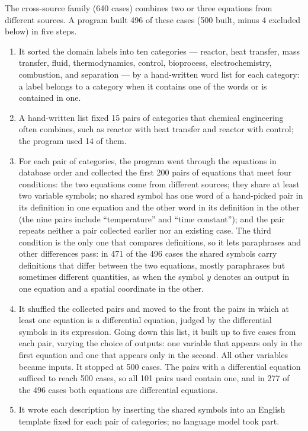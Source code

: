 The cross-source family (640 cases) combines two or three equations from different sources. A
program built 496 of these cases (500 built, minus 4 excluded below) in five steps.
\begin{enumerate}
  \item It sorted the domain labels into ten categories --- reactor, heat transfer, mass transfer,
    fluid, thermodynamics, control, bioprocess, electrochemistry, combustion, and separation --- by
    a hand-written word list for each category: a label belongs to a category when it contains one
    of the words or is contained in one.
  \item A hand-written list fixed 15 pairs of categories that chemical engineering often combines,
    such as reactor with heat transfer and reactor with control; the program used 14 of them.
  \item For each pair of categories, the program went through the equations in database order and
    collected the first 200 pairs of equations that meet four conditions: the two equations come
    from different sources; they share at least two variable symbols; no shared symbol has one word
    of a hand-picked pair in its definition in one equation and the other word in its definition in
    the other (the nine pairs include ``temperature'' and ``time constant''); and the pair repeats
    neither a pair collected earlier nor an existing case. The third condition is the only one that
    compares definitions, so it lets paraphrases and other differences pass: in 471 of the 496 cases
    the shared symbols carry definitions that differ between the two equations, mostly paraphrases
    but sometimes different quantities, as when the symbol $y$ denotes an output in one equation and
    a spatial coordinate in the other.
  \item It shuffled the collected pairs and moved to the front the pairs in which at least one
    equation is a differential equation, judged by the differential symbols in its expression.
    Going down this list, it built up to five cases from each pair, varying the choice of outputs:
    one variable that appears only in the first equation and one that appears only in the second.
    All other variables became inputs. It stopped at 500 cases. The pairs with a differential
    equation sufficed to reach 500 cases, so all 101 pairs used contain one, and in 277 of the 496
    cases both equations are differential equations.
  \item It wrote each description by inserting the shared symbols into an English template fixed
    for each pair of categories; no language model took part.
\end{enumerate}
